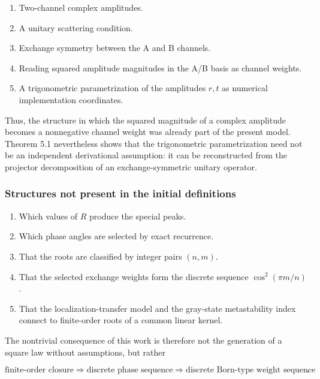 \documentclass[
  a4paper,
  10pt]{article}
\providecommand{\tightlist}{%
  \setlength{\itemsep}{0pt}\setlength{\parskip}{0pt}}
\begin{document}
\begin{enumerate}
\def\labelenumi{\arabic{enumi}.}
\tightlist
\item
  Two-channel complex amplitudes.
\item
  A unitary scattering condition.
\item
  Exchange symmetry between the A and B channels.
\item
  Reading squared amplitude magnitudes in the A/B basis as channel
  weights.
\item
  A trigonometric parametrization of the amplitudes \(r,t\) as numerical
  implementation coordinates.
\end{enumerate}

Thus, the structure in which the squared magnitude of a complex
amplitude becomes a nonnegative channel weight was already part of the
present model. Theorem 5.1 nevertheless shows that the trigonometric
parametrization need not be an independent derivational assumption: it
can be reconstructed from the projector decomposition of an
exchange-symmetric unitary operator.

\subsubsection{Structures not present in the initial
definitions}\label{structures-not-present-in-the-initial-definitions}

\begin{enumerate}
\def\labelenumi{\arabic{enumi}.}
\tightlist
\item
  Which values of \(R\) produce the special peaks.
\item
  Which phase angles are selected by exact recurrence.
\item
  That the roots are classified by integer pairs \((n,m)\).
\item
  That the selected exchange weights form the discrete sequence
  \(\cos^2(\pi m/n)\).
\item
  That the localization-transfer model and the gray-state metastability
  index connect to finite-order roots of a common linear kernel.
\end{enumerate}

The nontrivial consequence of this work is therefore not the generation
of a square law without assumptions, but rather

\[
\boxed{
\text{finite-order closure}
\Rightarrow
\text{discrete phase sequence}
\Rightarrow
\text{discrete Born-type weight sequence}
}.
\]
\end{document}
